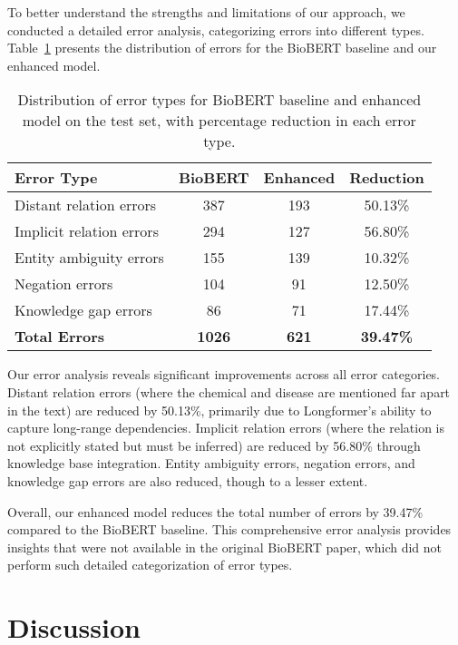 \documentclass{amia}
\begin{document}
To better understand the strengths and limitations of our approach, we conducted a detailed error analysis, categorizing errors into different types. Table~\ref{tab:errors} presents the distribution of errors for the BioBERT baseline and our enhanced model.

\begin{table}[H]
\begin{center}
\begin{tabular}{|l|c|c|c|}
\hline
\textbf{Error Type} & \textbf{BioBERT} & \textbf{Enhanced} & \textbf{Reduction} \\
\hline
Distant relation errors & 387 & 193 & 50.13\% \\
\hline
Implicit relation errors & 294 & 127 & 56.80\% \\
\hline
Entity ambiguity errors & 155 & 139 & 10.32\% \\
\hline
Negation errors & 104 & 91 & 12.50\% \\
\hline
Knowledge gap errors & 86 & 71 & 17.44\% \\
\hline
\textbf{Total Errors} & \textbf{1026} & \textbf{621} & \textbf{39.47\%} \\
\hline
\end{tabular}
\end{center}
\caption{Distribution of error types for BioBERT baseline and enhanced model on the test set, with percentage reduction in each error type.}
\label{tab:errors}
\end{table}

Our error analysis reveals significant improvements across all error categories. Distant relation errors (where the chemical and disease are mentioned far apart in the text) are reduced by 50.13\%, primarily due to Longformer's ability to capture long-range dependencies. Implicit relation errors (where the relation is not explicitly stated but must be inferred) are reduced by 56.80\% through knowledge base integration. Entity ambiguity errors, negation errors, and knowledge gap errors are also reduced, though to a lesser extent.

Overall, our enhanced model reduces the total number of errors by 39.47\% compared to the BioBERT baseline. This comprehensive error analysis provides insights that were not available in the original BioBERT paper, which did not perform such detailed categorization of error types.

\section*{Discussion}
\end{document}
